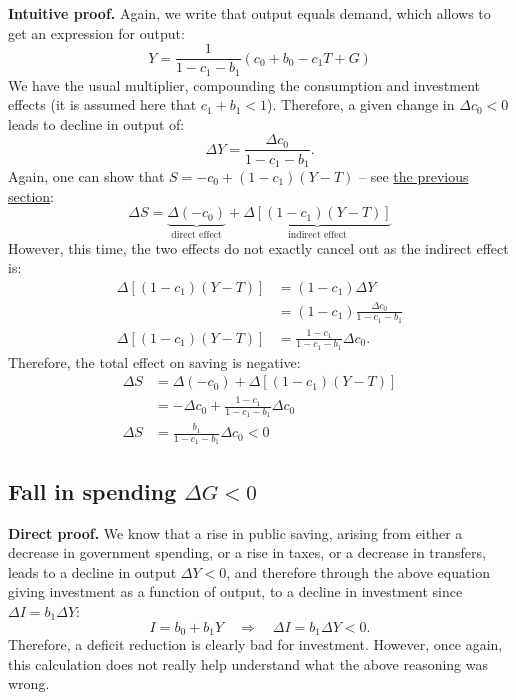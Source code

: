 \documentclass[]{book}
\theoremstyle{definition}
\theoremstyle{definition}
\theoremstyle{definition}
\theoremstyle{remark}
\begin{document}
\textbf{Intuitive proof.} Again, we write that output equals demand,
which allows to get an expression for output:
\[Y=\frac{1}{1-c_{1}-b_{1}}\left(c_{0}+b_{0}-c_{1}T+G\right)\] We have
the usual multiplier, compounding the consumption and investment effects
(it is assumed here that \(c_{1}+b_{1}<1\)). Therefore, a given change
in \(\Delta c_{0}<0\) leads to decline in output of:
\[\Delta Y=\frac{\Delta c_{0}}{1-c_{1}-b_{1}}.\] Again, one can show
that \(S=-c_{0}+\left(1-c_{1}\right)\left(Y-T\right)\) -- see
\protect\hyperlink{simple}{the previous section}:
\[\Delta S=\underbrace{\Delta(-c_{0})}_{\text{direct effect}}+\underbrace{\Delta\left[\left(1-c_{1}\right)\left(Y-T\right)\right]}_{\text{indirect effect}}\]
However, this time, the two effects do not exactly cancel out as the
indirect effect is: \[
\begin{aligned}
\Delta\left[\left(1-c_{1}\right)\left(Y-T\right)\right] &=(1-c_{1})\Delta Y\\
    &=(1-c_{1})\frac{\Delta c_{0}}{1-c_{1}-b_{1}}\\
\Delta\left[\left(1-c_{1}\right)\left(Y-T\right)\right] &=\frac{1-c_{1}}{1-c_{1}-b_{1}}\Delta c_{0}.
\end{aligned}
\] Therefore, the total effect on saving is negative: \[
\begin{aligned}
\Delta S    &=\Delta(-c_{0})+\Delta\left[\left(1-c_{1}\right)\left(Y-T\right)\right]\\
    &=-\Delta c_{0}+\frac{1-c_{1}}{1-c_{1}-b_{1}}\Delta c_{0}\\
\Delta S    &=\frac{b_{1}}{1-c_{1}-b_{1}}\Delta c_{0} <0
\end{aligned}
\]

\subsection{\texorpdfstring{Fall in spending
\(\Delta G<0\)}{Fall in spending \textbackslash{}Delta G\textless{}0}}\label{fall-in-spending-delta-g0-1}

\textbf{Direct proof.} We know that a rise in public saving, arising
from either a decrease in government spending, or a rise in taxes, or a
decrease in transfers, leads to a decline in output \(\Delta Y<0\), and
therefore through the above equation giving investment as a function of
output, to a decline in investment since \(\Delta I=b_{1}\Delta Y\):
\[I=b_{0}+b_{1}Y\quad\Rightarrow\quad\Delta I=b_{1}\Delta Y<0.\]
Therefore, a deficit reduction is clearly bad for investment. However,
once again, this calculation does not really help understand what the
above reasoning was wrong.
\end{document}
